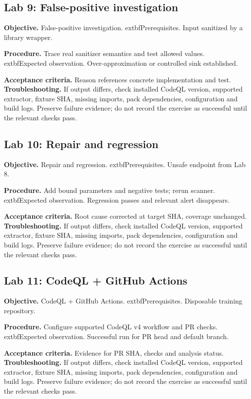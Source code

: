 \documentclass[11pt,letterpaper,oneside]{book}
\begin{document}
\subsection{Lab 9: False-positive investigation}

\textbf{Objective.} False-positive investigation. 	extbf{Prerequisites.} Input sanitized by a library wrapper.

\textbf{Procedure.} Trace real sanitizer semantics and test allowed values. 	extbf{Expected observation.} Over-approximation or controlled sink established.

\textbf{Acceptance criteria.} Reason references concrete implementation and test. \textbf{Troubleshooting.} If output differs, check installed CodeQL version, supported extractor, fixture SHA, missing imports, pack dependencies, configuration and build logs. Preserve failure evidence; do not record the exercise as successful until the relevant checks pass.

\subsection{Lab 10: Repair and regression}

\textbf{Objective.} Repair and regression. 	extbf{Prerequisites.} Unsafe endpoint from Lab 8.

\textbf{Procedure.} Add bound parameters and negative tests; rerun scanner. 	extbf{Expected observation.} Regression passes and relevant alert disappears.

\textbf{Acceptance criteria.} Root cause corrected at target SHA, coverage unchanged. \textbf{Troubleshooting.} If output differs, check installed CodeQL version, supported extractor, fixture SHA, missing imports, pack dependencies, configuration and build logs. Preserve failure evidence; do not record the exercise as successful until the relevant checks pass.

\subsection{Lab 11: CodeQL + GitHub Actions}

\textbf{Objective.} CodeQL + GitHub Actions. 	extbf{Prerequisites.} Disposable training repository.

\textbf{Procedure.} Configure supported CodeQL v4 workflow and PR checks. 	extbf{Expected observation.} Successful run for PR head and default branch.

\textbf{Acceptance criteria.} Evidence for PR SHA, checks and analysis status. \textbf{Troubleshooting.} If output differs, check installed CodeQL version, supported extractor, fixture SHA, missing imports, pack dependencies, configuration and build logs. Preserve failure evidence; do not record the exercise as successful until the relevant checks pass.
\end{document}
